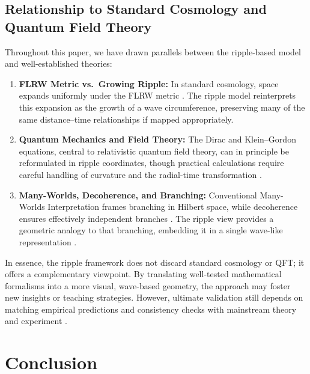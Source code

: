 \documentclass{article}
\begin{document}
\subsection{Relationship to Standard Cosmology and Quantum Field Theory}
\label{subsec:relationship-standard}
Throughout this paper, we have drawn parallels between the ripple-based model 
and well-established theories:
\begin{enumerate}
  \item \textbf{FLRW Metric vs.\ Growing Ripple:} 
    In standard cosmology, space expands uniformly under the FLRW metric 
    \cite{rindler1977essential, misner1973}. The ripple model reinterprets 
    this expansion as the growth of a wave circumference, preserving many of 
    the same distance--time relationships if mapped appropriately.
  \item \textbf{Quantum Mechanics and Field Theory:} 
    The Dirac and Klein--Gordon equations, central to relativistic quantum 
    field theory, can in principle be reformulated in ripple coordinates, 
    though practical calculations require careful handling of curvature 
    and the radial-time transformation \cite{Dirac1928, griffiths2005introduction}.
  \item \textbf{Many-Worlds, Decoherence, and Branching:} 
    Conventional Many-Worlds Interpretation frames branching in Hilbert space, 
    while decoherence ensures effectively independent branches \cite{everett1957, dewitt1971}. 
    The ripple view provides a geometric analogy to that branching, embedding it 
    in a single wave-like representation \cite{penrose2004, nielsenchuang2000}.
\end{enumerate}
In essence, the ripple framework does not discard standard cosmology or QFT; 
it offers a complementary viewpoint. By translating well-tested mathematical 
formalisms into a more visual, wave-based geometry, the approach may foster 
new insights or teaching strategies. However, ultimate validation still depends 
on matching empirical predictions and consistency checks with mainstream theory 
and experiment \cite{carroll2010}.

\section{Conclusion}
\label{sec:conclusion}
\end{document}
